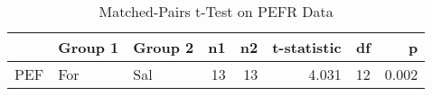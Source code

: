 \begin{table}

\caption{\label{tab:tTest}Matched-Pairs t-Test on PEFR Data}
\centering
\begin{tabular}[t]{lllrrrrr}
\toprule
 & Group 1 & Group 2 & n1 & n2 & t-statistic & df & p\\
\midrule
PEF & For & Sal & 13 & 13 & 4.031 & 12 & 0.002\\
\bottomrule
\end{tabular}
\end{table}
